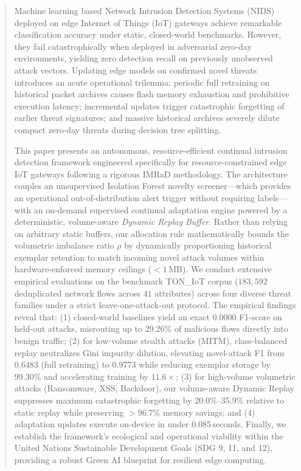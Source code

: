\documentclass[conference]{IEEEtran}
\begin{document}
\begin{abstract}
Machine learning based Network Intrusion Detection Systems (NIDS) deployed on edge Internet of Things (IoT) gateways achieve remarkable classification accuracy under static, closed-world benchmarks. However, they fail catastrophically when deployed in adversarial zero-day environments, yielding zero detection recall on previously unobserved attack vectors. Updating edge models on confirmed novel threats introduces an acute operational trilemma: periodic full retraining on historical packet archives causes flash memory exhaustion and prohibitive execution latency; incremental updates trigger catastrophic forgetting of earlier threat signatures; and massive historical archives severely dilute compact zero-day threats during decision tree splitting. 

This paper presents an autonomous, resource-efficient continual intrusion detection framework engineered specifically for resource-constrained edge IoT gateways following a rigorous IMRaD methodology. The architecture couples an unsupervised Isolation Forest novelty screener—which provides an operational out-of-distribution alert trigger without requiring labels—with an on-demand supervised continual adaptation engine powered by a deterministic, volume-aware \emph{Dynamic Replay Buffer}. Rather than relying on arbitrary static buffers, our allocation rule mathematically bounds the volumetric imbalance ratio $\rho$ by dynamically proportioning historical exemplar retention to match incoming novel attack volumes within hardware-enforced memory ceilings ($<1$\,MB). We conduct extensive empirical evaluations on the benchmark TON\_IoT corpus ($183{,}592$ deduplicated network flows across $41$ attributes) across four diverse threat families under a strict leave-one-attack-out protocol. The empirical findings reveal that: (1) closed-world baselines yield an exact 0.0000 F1-score on held-out attacks, misrouting up to $29.26\%$ of malicious flows directly into benign traffic; (2) for low-volume stealth attacks (MITM), class-balanced replay neutralizes Gini impurity dilution, elevating novel-attack F1 from 0.6483 (full retraining) to 0.9773 while reducing exemplar storage by 99.30\% and accelerating training by $11.6\times$; (3) for high-volume volumetric attacks (Ransomware, XSS, Backdoor), our volume-aware Dynamic Replay suppresses maximum catastrophic forgetting by 20.0\%--35.9\% relative to static replay while preserving $>96.7\%$ memory savings; and (4) adaptation updates execute on-device in under 0.085\,seconds. Finally, we establish the framework's ecological and operational viability within the United Nations Sustainable Development Goals (SDG 9, 11, and 12), providing a robust Green AI blueprint for resilient edge computing.
\end{abstract}
\end{document}
